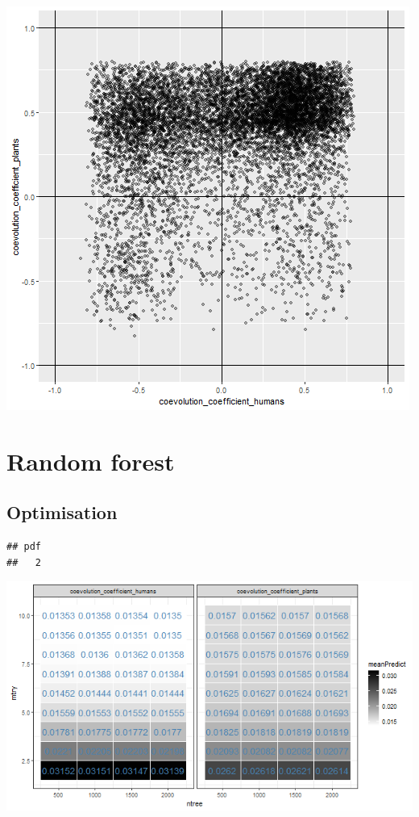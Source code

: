 \documentclass[
]{book}
\begin{document}
\newpage

\includegraphics[width=1\linewidth]{plots/5_LHS_coevo_end_state}

\newpage

\hypertarget{random-forest}{%
\section{Random forest}\label{random-forest}}

\hypertarget{optimisation}{%
\subsection{Optimisation}\label{optimisation}}

\begin{verbatim}
## pdf 
##   2
\end{verbatim}

\includegraphics[width=1\linewidth]{plots/5_LHS_coevo_optimisationPlot}
\end{document}

